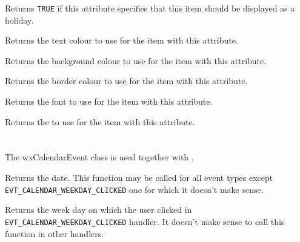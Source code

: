 
Returns {\tt TRUE} if this attribute specifies that this item should be
displayed as a holiday.

\label{wxcalendardateattrgettextcolour}


Returns the text colour to use for the item with this attribute.

\label{wxcalendardateattrgetbackgroundcolour}


Returns the background colour to use for the item with this attribute.

\label{wxcalendardateattrgetbordercolour}


Returns the border colour to use for the item with this attribute.

\label{wxcalendardateattrgetfont}


Returns the font to use for the item with this attribute.

\label{wxcalendardateattrgetborder}


Returns the  to use for the item with this attribute.

\section{}\label{wxcalendarevent}

The wxCalendarEvent class is used together with 
.






Returns the date. This function may be called for all event types except 
{\tt EVT\_CALENDAR\_WEEKDAY\_CLICKED} one for which it doesn't make sense.



Returns the week day on which the user clicked in 
{\tt EVT\_CALENDAR\_WEEKDAY\_CLICKED} handler. It doesn't make sense to call
this function in other handlers.

